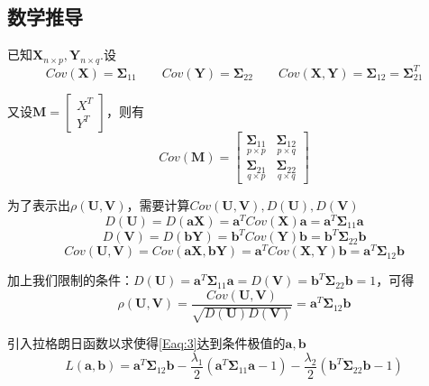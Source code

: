 \documentclass[withoutpreface]{cumcmthesis}
\begin{document}
\subsection{数学推导}
已知$\mathbf{X}_{n\times p},\mathbf{Y}_{n\times q}$.设
$$Cov(\mathbf{X})=\boldsymbol{\Sigma }_{11}\qquad Cov(\mathbf{Y})=\boldsymbol{\Sigma}_{22} \qquad Cov(\mathbf{X},\mathbf{Y})=\boldsymbol{\Sigma}_{12}=\boldsymbol{\Sigma}^{T}_{21}$$

又设$\mathbf{M}=\begin{bmatrix}
        X^T \\ Y^T
    \end{bmatrix}$，则有
\begin{equation}\label{Eq:3}
    Cov(\mathbf{M})=\begin{bmatrix}
        \underset{p\times p}{\boldsymbol{\Sigma}_{11}} & \underset{p\times q}{\boldsymbol{\Sigma}_{12}} \\
        \underset{q\times p}{\boldsymbol{\Sigma}_{21}} & \underset{q\times q}{\boldsymbol{\Sigma}_{22}}
    \end{bmatrix}
\end{equation}

为了表示出$\rho (\mathbf{U},\mathbf{V})$，需要计算$Cov(\mathbf{U},\mathbf{V}),D(\mathbf{U}),D(\mathbf{V})$
$$D(\mathbf{U})=D(\mathbf{aX})=\mathbf{a}^TCov(\mathbf{X})\mathbf{a}=\mathbf{a}^T{\boldsymbol{\Sigma}_{11}}\mathbf{a}$$
$$D(\mathbf{V})=D(\mathbf{bY})=\mathbf{b}^TCov(\mathbf{Y})\mathbf{b}=\mathbf{b}^T{\boldsymbol{\Sigma}_{22}}\mathbf{b}$$
$$Cov(\mathbf{U},\mathbf{V})=Cov(\mathbf{aX},\mathbf{bY})=\mathbf{a}^TCov(\mathbf{X},\mathbf{Y})\mathbf{b}=\mathbf{a}^T{\boldsymbol{\Sigma}_{12}}\mathbf{b}$$

加上我们限制的条件：$D(\mathbf{U})=\mathbf{a}^T{\boldsymbol{\Sigma}_{11}}\mathbf{a}=D(\mathbf{V})=\mathbf{b}^T{\boldsymbol{\Sigma}_{22}}\mathbf{b}=1$，可得
\begin{equation}\label{Eaq:3}
    \rho (\mathbf{U},\mathbf{V})=\frac{Cov(\mathbf{U},\mathbf{V})}{\sqrt{D(\mathbf{U})D(\mathbf{V})}}=\mathbf{a}^T{\boldsymbol{\Sigma}_{12}}\mathbf{b}
\end{equation}

引入拉格朗日函数以求使得\cref{Eaq:3}达到条件极值的$\mathbf{a},\mathbf{b}$
\begin{equation}
    L(\mathbf{a},\mathbf{b})=\mathbf{a}^T{\boldsymbol{\Sigma}_{12}}\mathbf{b}-\frac{\lambda_1}{2}(\mathbf{a}^T{\boldsymbol{\Sigma}_{11}}\mathbf{a}-1)-\frac{\lambda_2}{2}(\mathbf{b}^T{\boldsymbol{\Sigma}_{22}}\mathbf{b}-1)
\end{equation}
\end{document}
